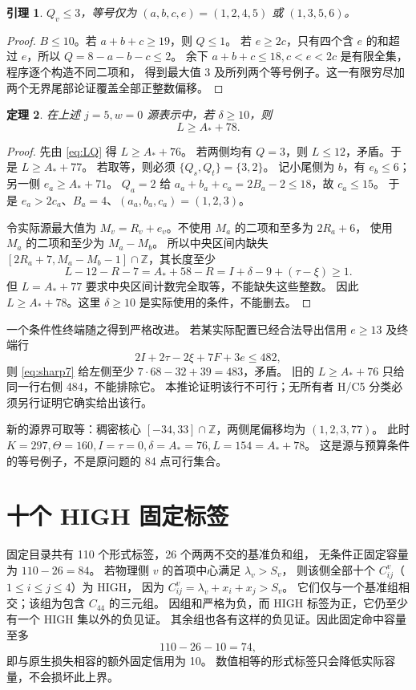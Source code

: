 \documentclass[11pt,a4paper]{article}
\newcommand{\Z}{\mathbb Z}
\newcommand{\A}{A_*}
\newtheorem{theorem}{定理}[section]
\newtheorem{lemma}[theorem]{引理}
\begin{document}
\begin{lemma}\label{lem:quartet}
$Q_v\le3$，等号仅为 $(a,b,c,e)=(1,2,4,5)$ 或 $(1,3,5,6)$。
\end{lemma}
\begin{proof}
$B\le10$。若 $a+b+c\ge19$，则 $Q\le1$。
若 $e\ge2c$，只有四个含 $e$ 的和超过 $e$，所以 $Q=8-a-b-c\le2$。
余下 $a+b+c\le18,c<e<2c$ 是有限全集，程序逐个构造不同二项和，
得到最大值 3 及所列两个等号例子。这一有限穷尽加两个无界尾部论证覆盖全部正整数偏移。
\end{proof}

\begin{theorem}\label{thm:L}
在上述 $j=5,w=0$ 源表示中，若 $\delta\ge10$，则
\[\boxed{L\ge\A+78.}\]
\end{theorem}
\begin{proof}
先由 \eqref{eq:LQ} 得 $L\ge\A+76$。
若两侧均有 $Q=3$，则 $L\le12$，矛盾。于是 $L\ge\A+77$。
若取等，则必须 $\{Q_s,Q_t\}=\{3,2\}$。
记小尾侧为 $b$，有 $e_b\le6$；另一侧 $e_a\ge\A+71$。
$Q_a=2$ 给 $a_a+b_a+c_a=2B_a-2\le18$，故 $c_a\le15$。
于是 $e_a>2c_a$、$B_a=4$、$(a_a,b_a,c_a)=(1,2,3)$。

令实际源最大值为 $M_v=R_v+e_v$。不使用 $M_a$ 的二项和至多为 $2R_a+6$，
使用 $M_a$ 的二项和至少为 $M_a-M_b$。
所以中央区间内缺失
$[2R_a+7,M_a-M_b-1]\cap\Z$，其长度至少
\[
L-12-R-7=\A+58-R
=I+\delta-9+(\tau-\xi)\ge1.
\]
但 $L=\A+77$ 要求中央区间计数完全取等，不能缺失这些整数。
因此 $L\ge\A+78$。这里 $\delta\ge10$ 是实际使用的条件，不能删去。
\end{proof}

一个条件性终端随之得到严格改进。
若某实际配置已经合法导出信用 $e\ge13$ 及终端行
\[
2I+2\tau-2\xi+7F+3e\le482,
\]
则 \eqref{eq:sharp7} 给左侧至少 $7\cdot68-32+39=483$，矛盾。
旧的 $L\ge\A+76$ 只给同一行右侧 484，不能排除它。
本推论证明该行不可行；无所有者 H/C5 分类必须另行证明它确实给出该行。

新的源界可取等：稠密核心 $[-34,33]\cap\Z$，两侧尾偏移均为 $(1,2,3,77)$。
此时 $K=297,\Theta=160,I=\tau=0,\delta=\A=76,L=154=\A+78$。
这是源与预算条件的等号例子，不是原问题的 84 点可行集合。

\section{十个 HIGH 固定标签}
固定目录共有 110 个形式标签，26 个两两不交的基准负和组，
无条件正固定容量为 $110-26=84$。
若物理侧 $v$ 的首项中心满足 $\lambda_v>S_v$，
则该侧全部十个 $C^v_{ij}$（$1\le i\le j\le4$）为 HIGH，
因为 $C^v_{ij}=\lambda_v+x_i+x_j>S_v$。
它们仅与一个基准组相交；该组为包含 $C_{44}$ 的三元组。
因组和严格为负，而 HIGH 标签为正，它仍至少有一个 HIGH 集以外的负见证。
其余组也各有这样的负见证。因此固定命中容量至多
\[110-26-10=74,\]
即与原生损失相容的额外固定信用为 10。
数值相等的形式标签只会降低实际容量，不会损坏此上界。
\end{document}
